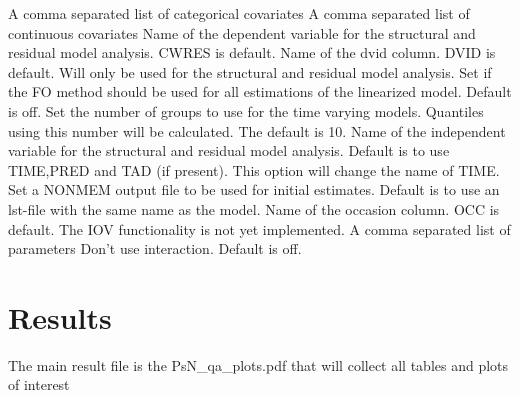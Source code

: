 \begin{optionlist}
A comma separated list of categorical covariates
\nextopt
{}
A comma separated list of continuous covariates
\nextopt
{}
Name of the dependent variable for the structural and residual model analysis. CWRES is default.
\nextopt
{}
Name of the dvid column. DVID is default.
Will only be used for the structural and residual model analysis.
\nextopt
{}
Set if the FO method should be used for all estimations
of the linearized model. Default is off.
\nextopt
{}
Set the number of groups to use for the time varying models.
Quantiles using this number will be calculated.
The default is 10.
\nextopt
{}
Name of the independent variable for the structural and residual model analysis.
Default is to use TIME,PRED and TAD (if present). This option will change the name
of TIME.
\nextopt
{}
Set a NONMEM output file to be used for initial estimates.
Default is to use an lst-file with the same name as the model.
\nextopt
{}
Name of the occasion column. OCC is default.
The IOV functionality is not yet implemented.
\nextopt
{}
A comma separated list of parameters
\nextopt
        Don't use interaction. Default is off.
    \nextopt
\end{optionlist}


\section{Results}

The main result file is the PsN\_qa\_plots.pdf that will collect all tables and plots of interest



